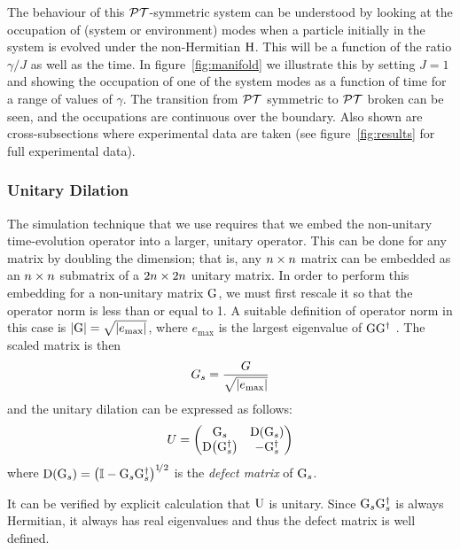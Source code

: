 The behaviour of this \(\mathcal{PT}\)-symmetric system can be understood by looking at
the occupation of (system or environment) modes when a particle initially in the
system is evolved under the non-Hermitian \(\mathrm{H}\). This will be a function
of the ratio \(\gamma/J\) as well as the time. In figure~\ref{fig:manifold} we
illustrate this by setting \(J=1\) and showing the occupation of one of the
system modes as a function of time for a range of values of \(\gamma\). The
transition from \(\mathcal{PT}\) symmetric to \(\mathcal{PT}\) broken can be seen, and the
occupations are continuous over the boundary. Also shown are cross-subsections
where experimental data are taken (see figure~\ref{fig:results} for full
experimental data).

\subsubsection{Unitary Dilation}
The simulation technique that we use requires that we embed the non-unitary
time-evolution operator into a larger, unitary operator. This can be done for
any matrix by doubling the dimension; that is, any \(n \times n\) matrix can be
embedded as an \(n \times n\) submatrix of a \(2n \times 2n\) unitary matrix. In order
to perform this embedding for a non-unitary matrix \(\mathrm{G}\), we must first
rescale it so that the operator norm is less than or equal to 1. A suitable
definition of operator norm in this case is \(\left|\mathrm{G}\right| = \sqrt{\left|e_{
\text{max}}\right|}\), where \(e_{\text{max}}\) is the largest eigenvalue of 
\(\mathrm{GG^{\dagger}}\) \cite{halmos-1950}. The scaled matrix is then
\begin{equation}
  G_{s} = \frac{G}{\sqrt{\left|e_{\text{max}}\right|}}
\end{equation}
and the unitary dilation can be expressed as follows:
\begin{equation}
  U = \begin{pmatrix}
    \mathrm{G}_{s} & \mathrm{D}\!\left(\mathrm{G}_{s}\right) \\
    \mathrm{D}\!\left(\mathrm{G}_{s}^{\dagger}\right) & -\mathrm{G}_{s}^{\dagger} \end{pmatrix}
\end{equation}
where \(\mathrm{D}\!\left(\mathrm{G}_{s}\right) = \left( \mathbb{I} - \mathrm{G}_{s}\mathrm{G}_{s}^{
\dagger} \right)^{1\!/2}
\) is the \emph{defect matrix} of \(\mathrm{G}_{s}\).

It can be verified by explicit calculation that \(\mathrm{U}\) is unitary.
Since \(\mathrm{G}_{s}\mathrm{G}_{s}^{\dagger}\) is always Hermitian, it always has
real eigenvalues and thus the defect matrix is well defined.

